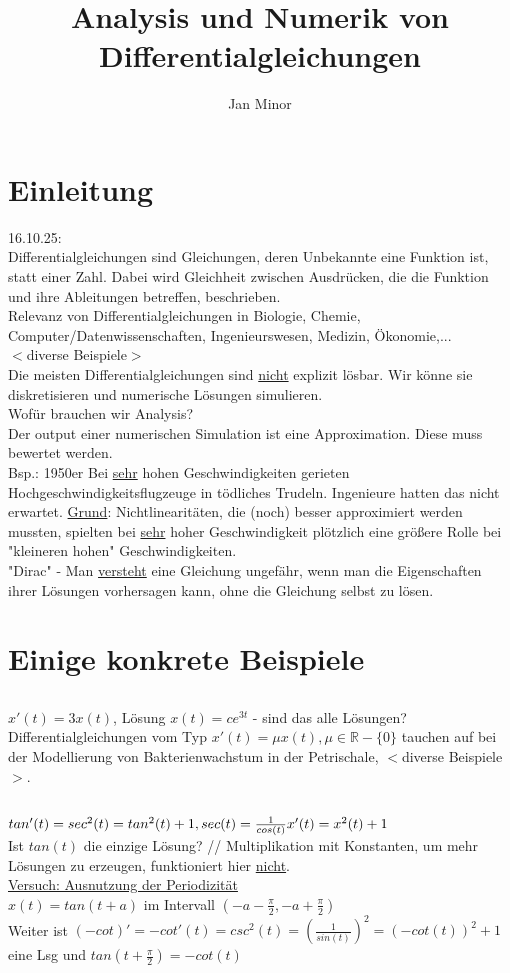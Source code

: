 \documentclass[12pt,a4paper]{article}
\author{Jan Minor}
\title{Analysis und Numerik von Differentialgleichungen}
\begin{document}
\section{Einleitung}
16.10.25: \\
Differentialgleichungen sind Gleichungen, deren Unbekannte eine Funktion ist, statt einer Zahl. Dabei wird Gleichheit zwischen Ausdrücken, die die Funktion und ihre Ableitungen betreffen, beschrieben. \\
Relevanz von Differentialgleichungen in Biologie, Chemie, Computer/Datenwissenschaften, Ingenieurswesen, Medizin, Ökonomie,... \\
$<$diverse Beispiele$>$ \\
Die meisten Differentialgleichungen sind \underline{nicht} explizit lösbar. Wir könne sie diskretisieren und numerische Lösungen simulieren. \\
Wofür brauchen wir Analysis? \\
Der output einer numerischen Simulation ist eine Approximation. Diese muss bewertet werden. \\
Bsp.: 1950er Bei \underline{sehr} hohen Geschwindigkeiten gerieten Hochgeschwindigkeitsflugzeuge in tödliches Trudeln. Ingenieure hatten das nicht erwartet. \underline{Grund}: Nichtlinearitäten, die (noch) besser approximiert werden mussten, spielten bei \underline{sehr} hoher Geschwindigkeit plötzlich eine größere Rolle bei "kleineren hohen" Geschwindigkeiten. \\
"Dirac" - Man \underline{versteht} eine Gleichung ungefähr, wenn man die Eigenschaften ihrer Lösungen vorhersagen kann, ohne die Gleichung selbst zu lösen. \\
\section{Einige konkrete Beispiele}
\subsection{}
$x'(t) = 3x(t)$, Lösung $x(t) = ce^{3t}$ - sind das alle Lösungen? \\
Differentialgleichungen vom Typ $x'(t)=\mu x(t), \mu \in \mathbb{R}-\{0\}$ tauchen auf bei der Modellierung von Bakterienwachstum in der Petrischale, $<$diverse Beispiele$>$.
\subsection{}
$tan'(t) = sec^2(t) = tan^2(t) + 1, sec(t) = \frac{1}{cos(t)} \\
x'(t) = x^2(t) + 1$ \\
Ist $tan(t)$ die einzige Lösung? //
Multiplikation mit Konstanten, um mehr Lösungen zu erzeugen, funktioniert hier \underline{nicht}. \\
\underline{Versuch: Ausnutzung der Periodizität} \\
$x(t) = tan(t + a)$ im Intervall $(-a-\frac{\pi}{2}, -a+\frac{\pi}{2})$ \\
Weiter ist $(-cot)' = -cot'(t) = csc^2(t) = (\frac{1}{sin(t)})^2 = (-cot(t))^2 + 1$ eine Lsg und $tan(t+\frac{\pi}{2}) = -cot(t)$ \\
\end{document}
